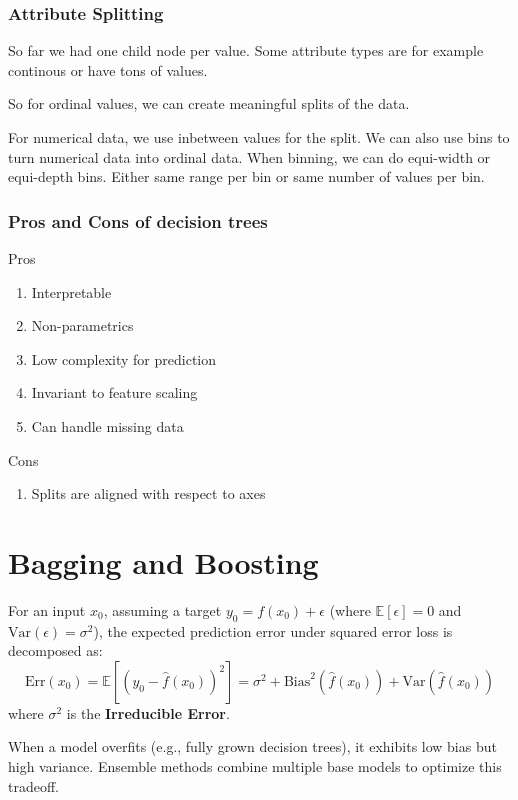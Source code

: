 \documentclass{article}
\begin{document}
\subsubsection{Attribute Splitting}
So far we had one child node per value. Some attribute types are for example continous or have tons of values.

So for ordinal values, we can create meaningful splits of the data.

For numerical data, we use inbetween values for the split. We can also use bins to turn numerical data into ordinal data. When binning, we can do equi-width or equi-depth bins. Either same range per bin or same number of values per bin.

\subsubsection{Pros and Cons of decision trees}
Pros
\begin{enumerate}
  \item Interpretable
  \item Non-parametrics
  \item Low complexity for prediction
  \item Invariant to feature scaling
  \item Can handle missing data
\end{enumerate}
Cons
\begin{enumerate}
  \item Splits are aligned with respect to axes
\end{enumerate}
\section{Bagging and Boosting}

For an input $x_0$, assuming a target $y_0 = f(x_0) + \epsilon$ (where $\mathbb{E}[\epsilon]=0$ and $\text{Var}(\epsilon)=\sigma^2$), the expected prediction error under squared error loss is decomposed as:
\[ \text{Err}(x_0) = \mathbb{E}\left[\left(y_0 - \hat{f}(x_0)\right)^2\right] = \sigma^2 + \text{Bias}^2\left(\hat{f}(x_0)\right) + \text{Var}\left(\hat{f}(x_0)\right) \]
where $\sigma^2$ is the \textbf{Irreducible Error}.

When a model overfits (e.g., fully grown decision trees), it exhibits low bias but high variance. Ensemble methods combine multiple base models to optimize this tradeoff.
\end{document}
